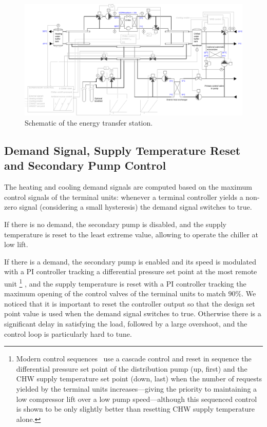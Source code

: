 \begin{figure}[!htbp]
\centering
\includegraphics[width=\linewidth]{figures/ChillerBorefield.pdf}
\caption{Schematic of the energy transfer station.}
\label{fig:schematic}
\end{figure}


\subsection{Demand Signal, Supply Temperature Reset and Secondary Pump Control} \label{sec:demand}

The heating and cooling demand signals are computed based on the maximum control signals of the terminal units: whenever a terminal controller yields a non-zero signal (considering a small hysteresis) the demand signal switches to true.

If there is no demand, the secondary pump is disabled, and the supply temperature is reset to the least extreme value, allowing to operate the chiller at low lift.

If there is a demand, the secondary pump is enabled and its speed is modulated with a PI controller tracking a differential pressure set point at the most remote unit%
\footnote{Modern control sequences~\cite{Llp2019} use a cascade control and reset in sequence the differential pressure set point of the distribution pump (up, first) and the CHW supply temperature set point (down, last) when the number of requests yielded by the terminal units increases---giving the priority to maintaining a low compressor lift over a low pump speed---although this sequenced control is
shown to be only slightly better than resetting CHW supply temperature alone.}%
, and the supply temperature is reset with a PI controller tracking the maximum opening of the control valves of the terminal units to match $90\%$.
We noticed that it is important to reset the controller output so that the design set point value is used when the demand signal switches to true. Otherwise there is a significant delay in satisfying the load, followed by a large overshoot, and the control loop is particularly hard to tune.

